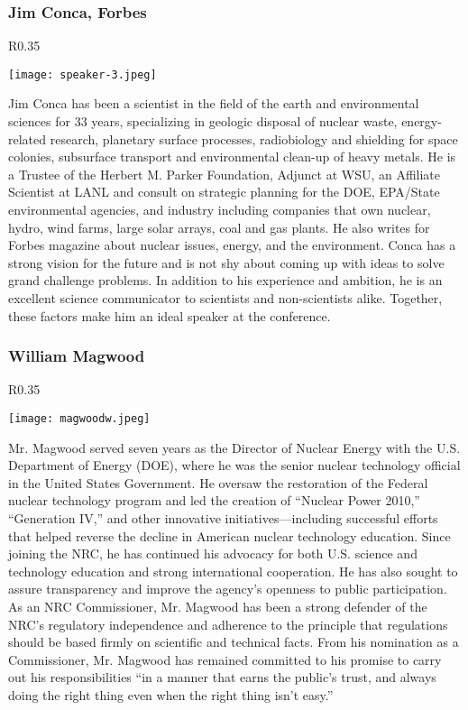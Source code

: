 \subsubsection{Jim Conca, Forbes}
\setlength\intextsep{0pt}
\begin{wrapfigure}{R}{0.35\textwidth}
	\begin{center}
		\vspace{-\baselineskip}
		\texttt{[image: speaker-3.jpeg]}
	\end{center}
\end{wrapfigure}
Jim Conca has been a scientist in the field of the earth and environmental sciences for 33 years, specializing in geologic disposal of nuclear waste, energy-related research, planetary surface processes, radiobiology and shielding for space colonies, subsurface transport and environmental clean-up of heavy metals. He is a Trustee of the Herbert M. Parker Foundation, Adjunct at WSU, an Affiliate Scientist at LANL and consult on strategic planning for the DOE, EPA/State environmental agencies, and industry including companies that own nuclear, hydro, wind farms, large solar arrays, coal and gas plants. He also writes for Forbes magazine about nuclear issues, energy, and the environment. Conca has a strong vision for the future and is not shy about coming up with ideas to solve grand challenge problems. In addition to his experience and ambition, he is an excellent science communicator to scientists and non-scientists alike. Together, these factors make him an ideal speaker at the conference.


\subsubsection{William Magwood}
\setlength\intextsep{0pt}
\begin{wrapfigure}{R}{0.35\textwidth}
	\begin{center}
		\vspace{-\baselineskip}
		\texttt{[image: magwoodw.jpeg]}
	\end{center}
\end{wrapfigure}
Mr. Magwood served seven years as the Director of Nuclear Energy with the U.S. Department of Energy (DOE), where he was the senior nuclear technology official in the United States Government. He oversaw the restoration of the Federal nuclear technology program and led the creation of ``Nuclear Power 2010,'' ``Generation IV,'' and other innovative initiatives—including successful efforts that helped reverse the decline in American nuclear technology education. Since joining the NRC, he has continued his advocacy for both U.S. science and technology education and strong international cooperation. He has also sought to assure transparency and improve the agency's openness to public participation. As an NRC Commissioner, Mr. Magwood has been a strong defender of the NRC's regulatory independence and adherence to the principle that regulations should be based firmly on scientific and technical facts. From his nomination as a Commissioner, Mr. Magwood has remained committed to his promise to carry out his responsibilities ``in a manner that earns the public's trust, and always doing the right thing even when the right thing isn't easy.''

